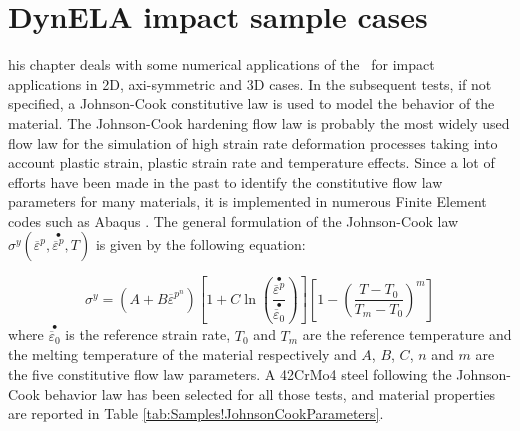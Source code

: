 %
%
%
\chapter{DynELA impact sample cases}

\startcontents[chapters]
\printmyminitoc[1]his chapter deals with some numerical applications of
the \DynELA~for impact applications in 2D, axi-symmetric and 3D
cases. In the subsequent tests, if not specified, a Johnson-Cook constitutive
law is used to model the behavior of the material. The Johnson-Cook
hardening flow law is probably the most widely used flow law for the
simulation of high strain rate deformation processes taking into account
plastic strain, plastic strain rate and temperature effects. Since
a lot of efforts have been made in the past to identify the constitutive
flow law parameters for many materials, it is implemented in numerous
Finite Element codes such as Abaqus \cite{abaqus20146}. The general
formulation of the Johnson-Cook law $\sigma^{y}(\overline{\varepsilon}^{p},\stackrel{\bullet}{\overline{\varepsilon}^{p}},T)$
is given by the following equation:

\begin{equation}
\sigma^{y}=\left(A+B\overline{\varepsilon}^{p^{n}}\right)\left[1+C\ln\left(\frac{\stackrel{\bullet}{\overline{\varepsilon}^{p}}}{\stackrel{\bullet}{\overline{\varepsilon}_{0}}}\right)\right]\left[1-\left(\frac{T-T_{0}}{T_{m}-T_{0}}\right)^{m}\right]\label{eq:Samples!Johnson-Cook}
\end{equation}
where $\stackrel{\bullet}{\overline{\varepsilon}_{0}}$ is the reference
strain rate, $T_{0}$ and $T_{m}$ are the reference temperature and
the melting temperature of the material respectively and $A$, $B$,
$C$, $n$ and $m$ are the five constitutive flow law parameters.
A 42CrMo4 steel following the Johnson-Cook behavior law has been selected
for all those tests, and material properties are reported in Table
\ref{tab:Samples!JohnsonCookParameters}.

